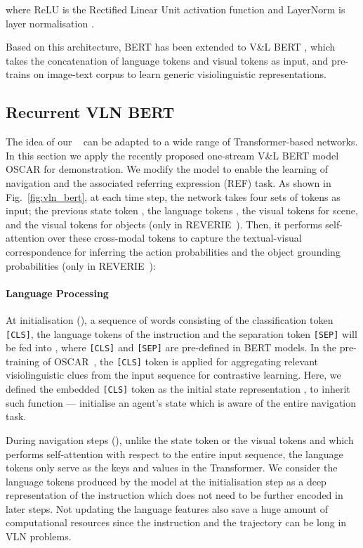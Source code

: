 \documentclass[final]{cvpr}
\begin{document}
where ReLU is the Rectified Linear Unit activation function and LayerNorm is layer normalisation \cite{ba2016layer}.

Based on this architecture, BERT has been extended to V\&L BERT \cite{chen2020uniter,li2020unicoder, li2019visualbert,li2020oscar,lu2019vilbert,su2019vl,tan2019lxmert}, which takes the concatenation of language tokens and visual tokens as input, and pre-trains on image-text corpus to learn generic visiolinguistic representations.



\subsection{Recurrent VLN BERT}
The idea of our \vlnbert~ can be adapted to a wide range of Transformer-based networks. In this section we apply the recently proposed one-stream V\&L BERT model OSCAR \cite{li2020oscar} for demonstration. We modify the model to enable the learning of navigation and the associated referring expression (REF) task. As shown in Fig.~\ref{fig:vln_bert}, at each time step, the network takes four sets of tokens as input; the previous state token , the language tokens , the visual tokens  for scene, and the visual tokens  for objects (only in REVERIE~\cite{qi2020reverie}). Then, it performs self-attention over these cross-modal tokens to capture the textual-visual correspondence for inferring the action probabilities  and the object grounding probabilities  (only in REVERIE~\cite{qi2020reverie}):


\vspace{-14pt}
\paragraph{Language Processing}
At initialisation (), a sequence of words consisting of the classification token \texttt{[CLS]}, the language tokens of the instruction  and the separation token \texttt{[SEP]} will be fed into \vlnbert, where \texttt{[CLS]} and \texttt{[SEP]} are pre-defined in BERT models.
In the pre-training of OSCAR~\cite{li2020oscar}, the \texttt{[CLS]} token is applied for aggregating relevant visiolinguistic clues from the input sequence for contrastive learning. 
Here, we defined the embedded \texttt{[CLS]} token as the initial state representation , to inherit such function — initialise an agent’s state which is aware of the entire navigation task.

During navigation steps (), unlike the state token  or the visual tokens  and  which performs self-attention with respect to the entire input sequence, the language tokens  only serve as the keys and values in the Transformer. We consider the language tokens produced by the model at the initialisation step as a deep representation of the instruction which does not need to be further encoded in later steps. Not updating the language features also save a huge amount of computational resources since the instruction and the trajectory can be long in VLN problems.
\end{document}

